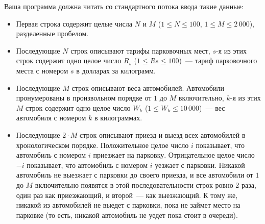 Ваша программа должна читать со стандартного потока ввода такие данные:
\begin{itemize}
\item Первая строка содержит целые числа $N$ и $M$ ($1 \le N \le 100$, $1 \le M \le 2\,000$), разделенные пробелом.
\item Последующие $N$ строк описывают тарифы парковочных мест, $s$-я из этих строк содержит одно целое число $R_s$ ($1 \le Rs \le 100$)~--- тариф парковочного места с номером $s$ в долларах за килограмм.
\item Последующие $M$ строк описывают веса автомобилей. Автомобили пронумерованы в
произвольном порядке от $1$ до $M$ включительно, $k$-я из этих $M$ строк содержит одно целое число $W_k$ ($1 \le W_k \le 10\,000$)~--- вес автомобиля с номером $k$ в килограммах.
\item Последующие $2\cdot M$ строк описывают приезд и выезд всех автомобилей в хронологическом порядке. Положительное целое число $i$ показывает, что автомобиль с номером $i$ приезжает на парковку. Отрицательное целое число $-i$ показывает, что автомобиль с номером $i$ уезжает с парковки. Никакой автомобиль не выезжает с парковки до своего приезда, и все автомобили от $1$ до $M$ включительно появятся в этой последовательности строк ровно 2 раза, один раз как приезжающий, и второй~--- как выезжающий. К тому же, никакой из автомобилей не выедет с парковки, пока не займет место на парковке (то есть, никакой автомобиль не уедет пока стоит в очереди). 
\end{itemize}